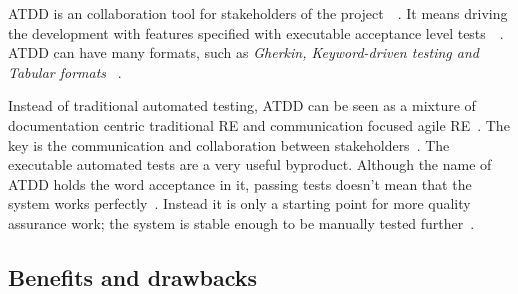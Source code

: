     ATDD is an collaboration tool for stakeholders of the project~\cite{gartner2012atdd}~\cite{haugset2012automated}. It means driving the
    development with features specified with executable acceptance level tests~\cite{gartner2012atdd}~\cite{haugset2012automated}.
    ATDD can have many formats, such as \textit{Gherkin, Keyword-driven testing and Tabular formats} ~\cite{gartner2012atdd}.

    Instead of traditional automated testing, ATDD can be seen as a mixture of documentation centric traditional RE and communication focused agile RE~\cite{haugset2012automated}.
    The key is the communication and collaboration between stakeholders~\cite{haugset2012automated}. The executable automated tests are a very useful byproduct.
    Although the name of ATDD holds the word acceptance in it, passing tests doesn't mean that the system works perfectly~\cite{gartner2012atdd}. Instead it is
    only a starting point for more quality assurance work; the system is stable enough to be manually tested further~\cite{acceptance2010}.

    \subsection{Benefits and drawbacks}

